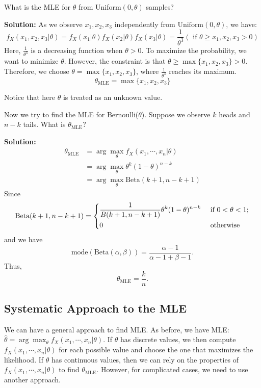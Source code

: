 \begin{eg}
  What is the MLE for \(\theta\) from Uniform\((0, \theta)\) samples? 

  \textbf{Solution:} 
  As we observe \(x_1, x_2, x_3\) independently from \(\text{Uniform}(0, \theta)\), we have:
  \[
    f_X(x_1, x_2, x_3 \vert \theta) = f_X(x_1 \vert \theta) f_X(x_2 \vert \theta) f_X(x_3 \vert \theta) = \dfrac{1}{\theta^3} (\text{ if } \theta \geq x_1, x_2, x_3 > 0)
  \]
  Here, \(\frac{1}{\theta^3}\) is a decreasing function when \(\theta > 0\). To maximize the probability, we want to minimize \(\theta\). However, the constraint is that \(\theta \geq \max\{x_1, x_2, x_3\} > 0\). Therefore, we choose \(\theta = \max \{x_1, x_2, x_3\}\), where \(\frac{1}{\theta^3}\) reaches its maximum.
  \[
    \theta_{\text{MLE}} = \max \{x_1, x_2, x_3\}
  \]  
\end{eg}
\begin{remark}
  Notice that here \(\theta\) is treated as an unknown value. 
\end{remark}

\begin{eg}
  Now we try to find the MLE for Bernoulli(\(\theta\)). Suppose we observe \(k\) heads and \(n - k\) tails. What is \(\theta_{\text{MLE}}\)?
  
  \textbf{Solution:}
  \[
    \begin{aligned}
      \theta_{\text{MLE}} &= \arg \max_\theta f_X (x_1, \cdots, x_n \vert \theta) \\
      &= \arg \max_\theta \theta^k (1 - \theta)^{n-k} \\
      &= \arg \max_\theta \text{Beta}(k + 1, n - k + 1)
    \end{aligned}
  \] 
  Since
  \[
    \text{Beta}(k + 1, n - k + 1) = \begin{dcases}
      \dfrac{1}{B(k + 1, n - k + 1)} \theta^k (1 - \theta)^{n-k}  &\text{ if } 0 < \theta < 1 ;\\
      0  &\text{ otherwise}
    \end{dcases}
  \]
  and we have 
  \[
    \text{mode}(\text{Beta}(\alpha, \beta)) = \dfrac{\alpha - 1}{\alpha - 1 + \beta - 1}. 
  \]
  Thus, 
  \[
    \theta_{\text{MLE}} = \dfrac{k}{n}. 
  \]
\end{eg}

\subsection{Systematic Approach to the MLE}
We can have a general approach to find MLE. As before, we have MLE: \(\hat{\theta} = \arg \max_\theta f_X (x_1, \cdots, x_n \vert \theta)\). If \(\theta\) has discrete values, we then compute \(f_X(x_1, \cdots, x_n \vert \theta)\) for each possible value and choose the one that maximizes the likelihood. If \(\theta\) has continuous values, then we can rely on the properties of \(f_X (x_1, \cdots, x_n \vert \theta)\) to find \(\theta_{\text{MLE}}\). However, for complicated cases, we need to use another approach. 

